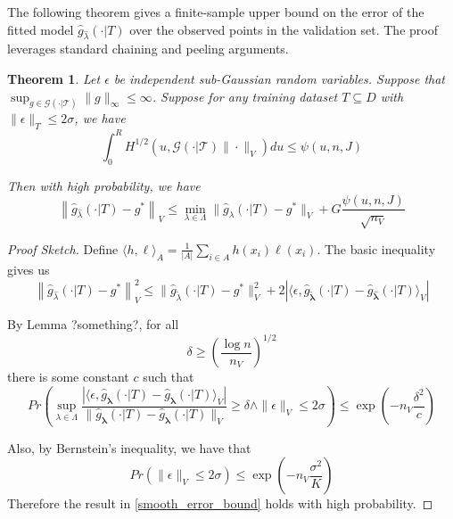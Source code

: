 \documentclass[12pt]{article}
\newtheorem{theorem}{Theorem}
\begin{document}
The following theorem gives a finite-sample upper bound on the error of the fitted model $\hat{g}_{\hat \lambda}(\cdot | T)$ over the observed points in the validation set. The proof leverages standard chaining and peeling arguments.

\begin{theorem}
\label{train_val_thrm}
Let $\epsilon$ be independent sub-Gaussian random variables. 
Suppose that $\sup_{g \in \mathcal{G(\cdot | T)}} \| g \|_\infty \le \infty$.
Suppose for any training dataset $T \subseteq D$ with $\| \epsilon \|_T \le 2 \sigma$, we have
\begin{equation}
\int_0^R H^{1/2} \left ( u, \mathcal{G(\cdot | T)} \| \cdot \|_V \right ) du \le \psi(u, n, J)
\end{equation}

Then with high probability, we have
\begin{equation}
\label{error_bound}
\left \|\hat{g}_{\hat{\lambda} }(\cdot | T) - g^* \right \|_V
\le 
\min_{\lambda \in \Lambda}\| \hat{g}_{\lambda}(\cdot | T) - g^*\|_V
+ G \frac{\psi(u, n, J)}{\sqrt{n_V}}
\end{equation}
\end{theorem}

\begin{proof}[Proof Sketch]
Define $\langle h, \ell \rangle_A = \frac{1}{|A|}\sum_{i\in A} h(x_i) \ell(x_i)$. 
The basic inequality gives us
\begin{equation}
\left \|\hat{g}_{\hat{\lambda} }(\cdot | T) - g^* \right \|_V^2
\le
\| \hat{g}_{\tilde{\lambda}}(\cdot | T) - g^*\|_V^2 + 
2 \left | \langle \epsilon, \hat{g}_{\tilde{\boldsymbol \lambda}}(\cdot | T) - \hat{g}_{\hat{\boldsymbol \lambda}}(\cdot | T) \rangle_V \right |
\end{equation}

By Lemma ?something?, for all
\begin{equation}
\delta \ge \left ( \frac{\log n}{n_V} \right )^{1/2}
\end{equation}
there is some constant $c$ such that
\begin{equation}
Pr \left (
\sup_{\lambda \in \Lambda}
\frac {\left | \langle \epsilon, \hat{g}_{\boldsymbol \lambda}(\cdot | T) - \hat{g}_{\boldsymbol \lambda}(\cdot | T) \rangle_V \right |}{\| \hat{g}_{\boldsymbol \lambda}(\cdot | T) - \hat{g}_{\boldsymbol \lambda}(\cdot | T) \|_V}
\ge \delta 
\wedge
\| \epsilon \|_V \le 2 \sigma
\right ) 
\le \exp \left ( - n_V \frac{\delta^2}{c} \right )
\end{equation}

Also, by Bernstein's inequality, we have that
\begin{equation}
Pr \left ( \| \epsilon \|_V \le 2 \sigma \right ) 
\le
\exp \left ( - n_V \frac{\sigma^2}{K} \right )
\end{equation}
Therefore the result in \eqref{smooth_error_bound} holds with high probability.
\end{proof}
\end{document}
